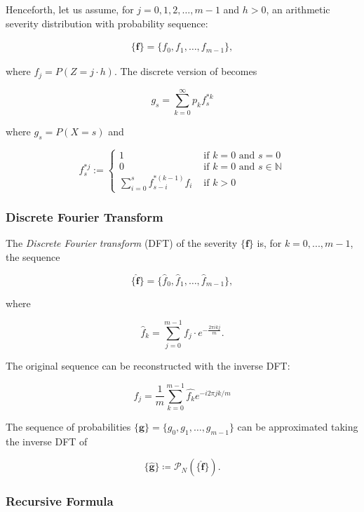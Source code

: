 \documentclass{article}
\begin{document}
Henceforth, let us assume, for $j=0,1,2,\ldots,m-1$ and $h>0$, an arithmetic severity distribution with probability sequence:

\begin{align*}
    \mathbf{\{f\}}=\{f_0, f_1, \ldots , f_{m-1}\},
\end{align*}


where $f_j=P(Z=j\cdot h)$. 
The discrete version of  becomes

$$
g_s=\sum_{k=0}^{\infty} p_k f_s^{* k}
$$

where $g_s = P(X=s)$ and 

\[
f_s^{* j}:= \begin{cases}1 & \text { if } k=0 \text { and } s=0 \\ 0 & \text { if } k=0 \text { and } s \in \mathbb{N} \\ \sum_{i=0}^s f_{s-i}^{*(k-1)} f_i & \text { if } k > 0\end{cases}
\]


\subsubsection{Discrete Fourier Transform}

The \textit{Discrete Fourier transform} (DFT) of the severity $\mathbf{\{f\}}$ is, for $k=0,...,m-1$, the sequence

$$\mathbf{\{\hat{f}\}}= \{\hat{f}_0, \hat{f}_1, \ldots, \hat{f}_{m-1} \},$$

where

\begin{equation}
\label{eq:DFT}
\widehat{f}_k=\sum_{j=0}^{m-1}f_j\cdot e^{-\frac{2\pi i k j}{m}}.
\end{equation}

The original sequence can be reconstructed with the inverse DFT:

$$f_j=\frac{1}{m} \sum_{k=0}^{m-1} \widehat{f_k} e^{-i 2 \pi j k / m}$$

The sequence of probabilities $\mathbf{\{g\}}=\{g_0, g_1, \ldots, g_{m-1}\}$ can be approximated taking the inverse DFT of 

\begin{equation}
\mathbf{\{ \hat{g}\}}\coloneqq \mathcal{P}_{N}\left(\mathbf{\{\hat{f}\}}\right).
\end{equation}

\subsubsection{Recursive Formula}
\end{document}
